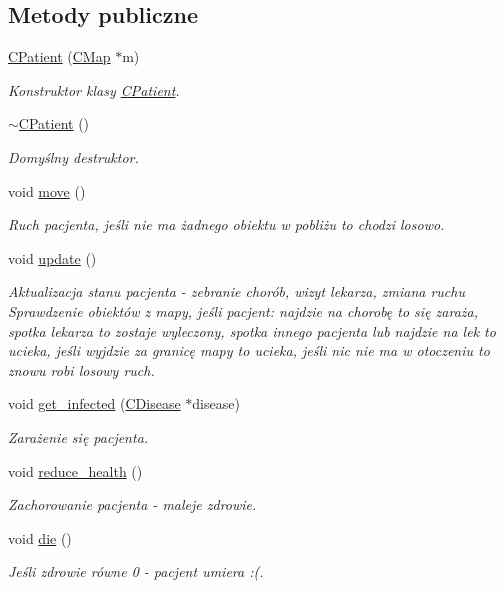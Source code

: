 \subsection*{Metody publiczne}
\begin{DoxyCompactItemize}
\item 
\mbox{\hyperlink{class_c_patient_a5f2b10b1ad6aead0382a8950b48d2011}{C\+Patient}} (\mbox{\hyperlink{class_c_map}{C\+Map}} $\ast$m)
\begin{DoxyCompactList}\small\item\em Konstruktor klasy \mbox{\hyperlink{class_c_patient}{C\+Patient}}. \end{DoxyCompactList}\item 
\mbox{\hyperlink{class_c_patient_ae744d8c6efd9d57da6592e8f9c272d3f}{$\sim$\+C\+Patient}} ()
\begin{DoxyCompactList}\small\item\em Domyślny destruktor. \end{DoxyCompactList}\item 
void \mbox{\hyperlink{class_c_patient_ae0af7da80587d2725acbb31923a41cd0}{move}} ()
\begin{DoxyCompactList}\small\item\em Ruch pacjenta, jeśli nie ma żadnego obiektu w pobliżu to chodzi losowo. \end{DoxyCompactList}\item 
void \mbox{\hyperlink{class_c_patient_a40dd4c549f4b40928b95dd4d8f2ad311}{update}} ()
\begin{DoxyCompactList}\small\item\em Aktualizacja stanu pacjenta -\/ zebranie chorób, wizyt lekarza, zmiana ruchu Sprawdzenie obiektów z mapy, jeśli pacjent\+: najdzie na chorobę to się zaraża, spotka lekarza to zostaje wyleczony, spotka innego pacjenta lub najdzie na lek to ucieka, jeśli wyjdzie za granicę mapy to ucieka, jeśli nic nie ma w otoczeniu to znowu robi losowy ruch. \end{DoxyCompactList}\item 
void \mbox{\hyperlink{class_c_patient_abc2af17d253627978b229cc9dcec5e58}{get\+\_\+infected}} (\mbox{\hyperlink{class_c_disease}{C\+Disease}} $\ast$disease)
\begin{DoxyCompactList}\small\item\em Zarażenie się pacjenta. \end{DoxyCompactList}\item 
void \mbox{\hyperlink{class_c_patient_a167c8f49c789e29394ef70964d25d118}{reduce\+\_\+health}} ()
\begin{DoxyCompactList}\small\item\em Zachorowanie pacjenta -\/ maleje zdrowie. \end{DoxyCompactList}\item 
void \mbox{\hyperlink{class_c_patient_a4d911cc3aa072d7e88abcb08c2c5d18d}{die}} ()
\begin{DoxyCompactList}\small\item\em Jeśli zdrowie równe 0 -\/ pacjent umiera \+:(. \end{DoxyCompactList}\end{DoxyCompactItemize}
